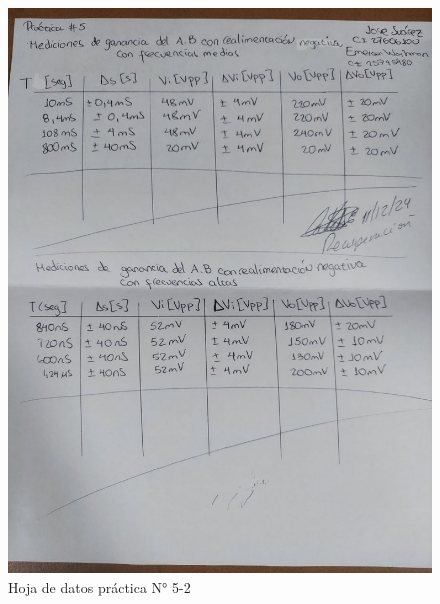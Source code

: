 \begin{figure}[ht]
    \centering
    \includegraphics[width=1.0\textwidth,angle=90]{src/images/p5/p5-hoja-de-datos-2.jpg}
    \caption{Hoja de datos práctica N° 5-2}
    \label{fig:hoja-de-datos-p5-2}
\end{figure}

